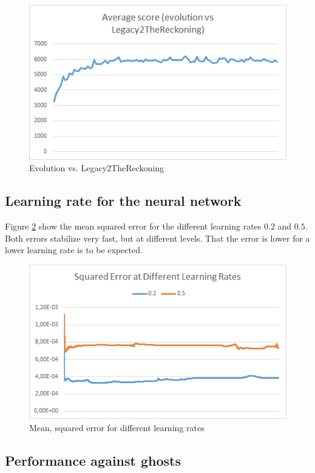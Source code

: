 \documentclass[conference]{IEEEtran}
\begin{document}
\begin{figure}[htp]
\centerline{\includegraphics[width=0.9\columnwidth]{l2_evo.png}}
\caption{Evolution vs. Legacy2TheReckoning}
\label{fig-evol2}
\end{figure}

\subsection{Learning rate for the neural network}

Figure \ref{fig-learnrate} show the mean squared error for the different learning rates $0.2$ and $0.5$. Both errors stabilize very fast, but at different levels. That the error is lower for a lower learning rate is to be expected. 

\begin{figure}[htp]
\centerline{\includegraphics[width=0.9\columnwidth]{learning_rate.png}}
\caption{Mean, squared error for different learning rates}
\label{fig-learnrate}
\end{figure}

\subsection{Performance against ghosts}
\end{document}
